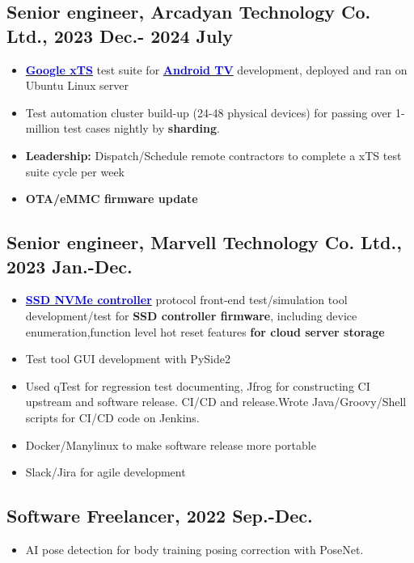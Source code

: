 \begin{experiencebox}
\subsection*{Senior engineer, Arcadyan Technology Co. Ltd., 2023 Dec.- 2024 July }
\begin{itemize}[noitemsep]
    \item \href{https://source.android.com/docs/compatibility/cts}{\textbf{\textcolor{blue}{Google xTS}}} test suite for \href{https://www.arcadyan.com/zh-hant/solutions/idea/stb/}{\textbf{\textcolor{blue}{Android TV}}} development, deployed and ran on Ubuntu Linux server
    \item Test automation cluster build-up (24-48 physical devices) for passing over 1-million test cases nightly by \textbf{sharding}.
    \item \textbf{Leadership:} Dispatch/Schedule remote contractors to complete a xTS test suite cycle per week
    \item \textbf{OTA/eMMC firmware update}
\end{itemize}

\vspace{0.3em}

\subsection*{Senior engineer, Marvell Technology Co. Ltd., 2023 Jan.-Dec.}
\begin{itemize}[noitemsep]
    \item \href{https://www.marvell.com/embedded-processors/armada-cp/}{\textbf{\textcolor{blue}{SSD NVMe controller}}} protocol front-end test/simulation tool development/test for \textbf{SSD controller firmware}, including device enumeration,function level hot reset features\textbf{ for cloud server storage}
    \item Test tool GUI development with PySide2
    \item Used qTest for regression test documenting, Jfrog for constructing CI upstream and software release. CI/CD and release.Wrote Java/Groovy/Shell scripts for CI/CD code on Jenkins.
    \item Docker/Manylinux to make software release more portable
    \item Slack/Jira for agile development
\end{itemize}

\vspace{0.3em}

\subsection*{Software Freelancer, 2022 Sep.-Dec.}
\begin{itemize}[noitemsep]
    \item AI pose detection for body training posing correction with PoseNet.
\end{itemize}


\end{experiencebox}
